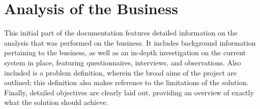 \part{Analysis of the Business} %
\label{prt:analysis_ _of_ _the_ _business_}
This initial part of the documentation features detailed information on the analysis that was performed on the business. It includes background information pertaining to the business, as well as an in-depth investigation on the current system in place, featuring questionnaires, interviews, and observations. Also included is a problem definition, wherein the broad aims of the project are outlined; this definition also makes reference to the limitations of the solution. Finally, detailed objectives are clearly laid out, providing an overview of exactly what the solution should achieve.








